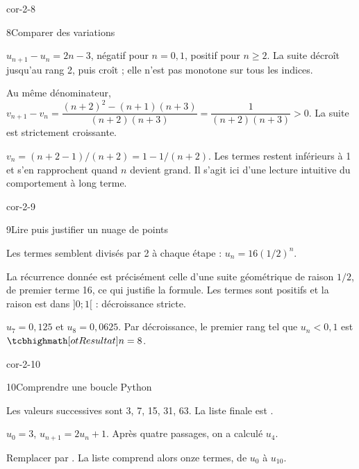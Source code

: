 \begin{blocLivre}{cor-2-8}
\begin{corrige}{8}{Comparer des variations}
\begin{questions}
\item $u_{n+1}-u_n=2n-3$, négatif pour $n=0,1$, positif pour $n\geq2$.
La suite décroît jusqu'au rang 2, puis croît ; elle n'est pas monotone sur tous les indices.
\item Au même dénominateur,
$v_{n+1}-v_n=\dfrac{(n+2)^2-(n+1)(n+3)}{(n+2)(n+3)}
=\dfrac1{(n+2)(n+3)}>0$. La suite est strictement croissante.
\item $v_n=(n+2-1)/(n+2)=1-1/(n+2)$.
Les termes restent inférieurs à 1 et s'en rapprochent quand $n$ devient grand.
Il s'agit ici d'une lecture intuitive du comportement à long terme.
\end{questions}
\end{corrige}
\end{blocLivre}
\begin{blocLivre}{cor-2-9}
\begin{corrige}{9}{Lire puis justifier un nuage de points}
\begin{questions}
\item Les termes semblent divisés par 2 à chaque étape : $u_n=16(1/2)^n$.
\item La récurrence donnée est précisément celle d'une suite géométrique
de raison $1/2$, de premier terme 16, ce qui justifie la formule.
Les termes sont positifs et la raison est dans $]0;1[$ : décroissance stricte.
\item $u_7=0{,}125$ et $u_8=0{,}0625$. Par décroissance, le premier rang
tel que $u_n<0{,}1$ est $\res{n=8}$.
\end{questions}
\end{corrige}
\end{blocLivre}
\begin{blocLivre}{cor-2-10}
\begin{corrige}{10}{Comprendre une boucle Python}
\begin{questions}
\item Les valeurs successives sont 3, 7, 15, 31, 63. La liste finale est
\code{[3, 7, 15, 31, 63]}.
\item $u_0=3$, $u_{n+1}=2u_n+1$. Après quatre passages, on a calculé $u_4$.
\item Remplacer  par .
La liste comprend alors onze termes, de $u_0$ à $u_{10}$.
\end{questions}
\end{corrige}
\end{blocLivre}

